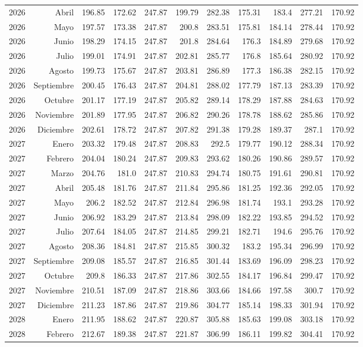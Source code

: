 \documentclass{article}%
\begin{document}
\begin{longtable}{|l r|r|r|r|r|r|r|r|r|r|}
2026&Abril&196.85&172.62&247.87&199.79&282.38&175.31&183.4&277.21&170.92\\%
2026&Mayo&197.57&173.38&247.87&200.8&283.51&175.81&184.14&278.44&170.92\\%
2026&Junio&198.29&174.15&247.87&201.8&284.64&176.3&184.89&279.68&170.92\\%
2026&Julio&199.01&174.91&247.87&202.81&285.77&176.8&185.64&280.92&170.92\\%
2026&Agosto&199.73&175.67&247.87&203.81&286.89&177.3&186.38&282.15&170.92\\%
2026&Septiembre&200.45&176.43&247.87&204.81&288.02&177.79&187.13&283.39&170.92\\%
2026&Octubre&201.17&177.19&247.87&205.82&289.14&178.29&187.88&284.63&170.92\\%
2026&Noviembre&201.89&177.95&247.87&206.82&290.26&178.78&188.62&285.86&170.92\\%
2026&Diciembre&202.61&178.72&247.87&207.82&291.38&179.28&189.37&287.1&170.92\\%
2027&Enero&203.32&179.48&247.87&208.83&292.5&179.77&190.12&288.34&170.92\\%
2027&Febrero&204.04&180.24&247.87&209.83&293.62&180.26&190.86&289.57&170.92\\%
2027&Marzo&204.76&181.0&247.87&210.83&294.74&180.75&191.61&290.81&170.92\\%
2027&Abril&205.48&181.76&247.87&211.84&295.86&181.25&192.36&292.05&170.92\\%
2027&Mayo&206.2&182.52&247.87&212.84&296.98&181.74&193.1&293.28&170.92\\%
2027&Junio&206.92&183.29&247.87&213.84&298.09&182.22&193.85&294.52&170.92\\%
2027&Julio&207.64&184.05&247.87&214.85&299.21&182.71&194.6&295.76&170.92\\%
2027&Agosto&208.36&184.81&247.87&215.85&300.32&183.2&195.34&296.99&170.92\\%
2027&Septiembre&209.08&185.57&247.87&216.85&301.44&183.69&196.09&298.23&170.92\\%
2027&Octubre&209.8&186.33&247.87&217.86&302.55&184.17&196.84&299.47&170.92\\%
2027&Noviembre&210.51&187.09&247.87&218.86&303.66&184.66&197.58&300.7&170.92\\%
2027&Diciembre&211.23&187.86&247.87&219.86&304.77&185.14&198.33&301.94&170.92\\%
2028&Enero&211.95&188.62&247.87&220.87&305.88&185.63&199.08&303.18&170.92\\%
2028&Febrero&212.67&189.38&247.87&221.87&306.99&186.11&199.82&304.41&170.92\\%

\end{longtable}
\end{document}
